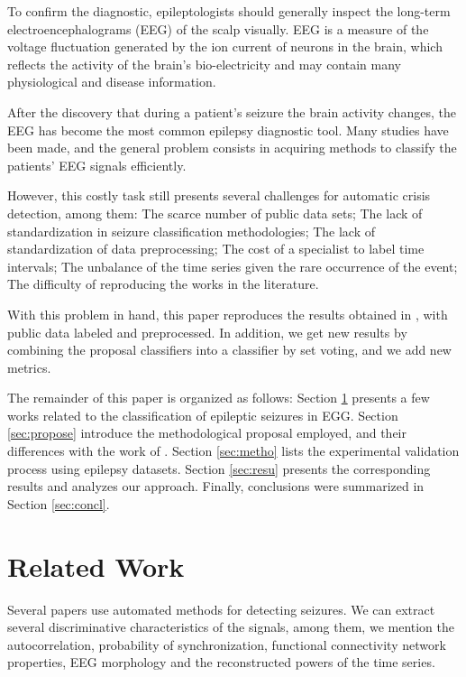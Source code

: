 To confirm the diagnostic, epileptologists should generally inspect the long-term electroencephalograms (EEG) of the scalp visually. EEG is a measure of the voltage fluctuation generated by the ion current of neurons in the brain, which reflects the activity of the brain’s bio-electricity and may contain many physiological and disease information. 

After the discovery that during a patient's seizure the brain activity changes, the EEG has become the most common epilepsy diagnostic tool. Many studies have been made, and the general problem consists in acquiring methods to classify the patients' EEG signals efficiently. 

However, this costly task still presents several challenges for automatic crisis detection, among them: The scarce number of public data sets; The lack of standardization in seizure classification methodologies; The lack of standardization of data preprocessing; The cost of a specialist to label time intervals; The unbalance of the time series given the rare occurrence of the event; The difficulty of reproducing the works in the literature.

With this problem in hand, this paper reproduces the results obtained in \cite{WenZha:2018}, with public data labeled and preprocessed. In addition, we get new results by combining the proposal classifiers into a classifier by set voting, and we add new metrics.

The remainder of this paper is organized as follows: Section \ref{sec:related} presents a few works related to the classification of epileptic seizures in EGG. Section \ref{sec:propose} introduce the methodological proposal employed, and their differences with the work of \cite{WenZha:2018}. Section \ref{sec:metho} lists the experimental validation process using epilepsy datasets. Section \ref{sec:resu} presents the corresponding results and analyzes our approach. Finally, conclusions were summarized in Section \ref{sec:concl}.


\section{Related Work}
\label{sec:related}

Several papers use automated methods for detecting seizures. We can extract several discriminative characteristics of the signals, among them, we mention the autocorrelation, probability of synchronization, functional connectivity network properties, EEG morphology and the reconstructed powers of the time series. 

